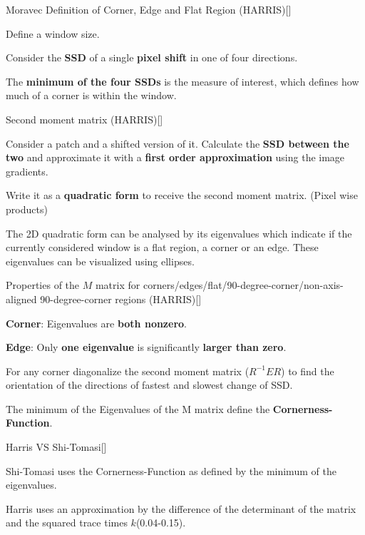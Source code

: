 \documentclass[10pt,a4paper]{scrartcl}
\begin{document}
\begin{multicols*}{2}
\begin{QandA}{Moravec Definition of Corner, Edge and Flat Region (HARRIS)}[\Derivation]
\item Define a window size.
\item Consider the \textbf{SSD} of a single \textbf{pixel shift} in one of four directions.
\item The \textbf{minimum of the four SSDs} is the measure of interest, which defines how much of a corner is within the window.
\end{QandA}

\begin{QandA}{Second moment matrix (HARRIS)}[\Derivation]
\item Consider a patch and a shifted version of it. Calculate the \textbf{SSD between the two} and approximate it with a \textbf{first order approximation} using the image gradients.
\item Write it as a \textbf{quadratic form} to receive the second moment matrix. (Pixel wise products)
\item The 2D quadratic form can be analysed by its eigenvalues which indicate if the currently considered window is a flat region, a corner or an edge. These eigenvalues can be visualized using ellipses.
\end{QandA}

\begin{QandA}{Properties of the $M$ matrix for corners/edges/flat/90-degree-corner/non-axis-aligned 90-degree-corner regions (HARRIS)}[\Derivation]
\item \textbf{Corner}: Eigenvalues are \textbf{both nonzero}.
\item \textbf{Edge}: Only \textbf{one eigenvalue} is significantly \textbf{larger than zero}.
\item For any corner diagonalize the second moment matrix ($R^{-1}ER$) to find the orientation of the directions of fastest and slowest change of SSD.
\item The minimum of the Eigenvalues of the M matrix define the \textbf{Cornerness-Function}.
\end{QandA}

\begin{QandA}{Harris VS Shi-Tomasi}[\Definition]
\item Shi-Tomasi uses the Cornerness-Function as defined by the minimum of the eigenvalues. 

\item Harris uses an approximation by the difference of the determinant of the matrix and the squared trace times $k$(0.04-0.15).


\end{QandA}
\end{multicols*}
\end{document}
